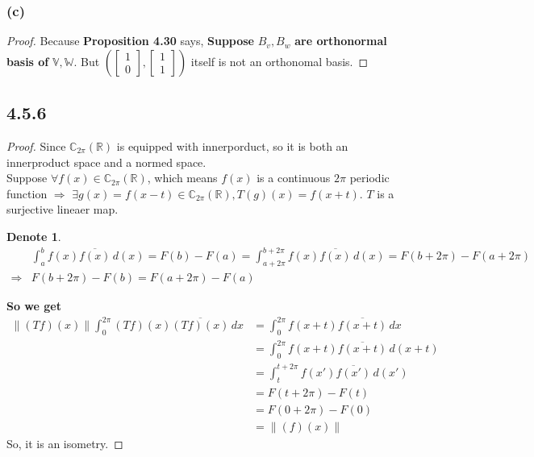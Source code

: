 \documentclass{article}
\newtheorem*{denote}{Denote}
\newtheorem*{proof}{Proof}
\begin{document}
\subsubsection*{(c)}
\begin{proof}
    Because \textbf{Proposition 4.30} says, \textbf{Suppose} $B_v, B_w$ \textbf{are orthonormal basis of} $\mathbb{V, W}$. But $ \left(\begin{bmatrix}
        1 \\ 0
    \end{bmatrix}, \begin{bmatrix}
        1 \\ 1
    \end{bmatrix} \right) $ itself is not an orthonomal basis.
\end{proof}

\subsection*{4.5.6}
\begin{proof}
    Since $\mathbb{C}_{2 \pi}(\mathbb{R})$ is equipped with innerporduct, so it is both an innerproduct space and a normed space. \\
    Suppose $\forall f(x) \in \mathbb{C}_{2 \pi}(\mathbb{R})$, which means $f(x)$ is a continuous $2 \pi$ periodic function $\Rightarrow$
    $\exists g(x) = f(x - t) \in \mathbb{C}_{2 \pi}(\mathbb{R}), T(g)(x) = f(x + t)$. $T$ is a surjective lineaer map.
    \begin{denote}
        \begin{equation*}
            \begin{split}
                & \int_{a}^{b} f(x) \overline{f(x)} \,d(x) = F(b) - F(a) = \int_{a + 2 \pi}^{b + 2 \pi} f(x) \overline{f(x)} \,d(x) = F(b + 2 \pi ) - F(a+ 2 \pi) \\
                \Rightarrow & F(b + 2 \pi) - F(b) =  F(a + 2 \pi) - F(a)
            \end{split}
        \end{equation*}
    \end{denote}

    \textbf{So we get}
    \begin{equation*}
        \begin{split}
            \|(Tf)(x)\|   \int_{0}^{2 \pi} (Tf)(x) \overline{(Tf)(x)} \,dx & = \int_{0}^{2 \pi} f(x+t) \overline{f(x+t)} \,dx \\
                        & = \int_{0}^{2 \pi} f(x+t) \overline{f(x+t)} \,d(x + t) \\
                        & = \int_{t}^{t + 2 \pi} f(x') \overline{f(x')} \,d(x') \\
                        & = F(t + 2 \pi) - F(t) \\
                        & = F(0 + 2 \pi) - F(0) \\
                        & = \|(f)(x)\|
        \end{split}
    \end{equation*}
    So, it is an isometry.
\end{proof}
\end{document}
